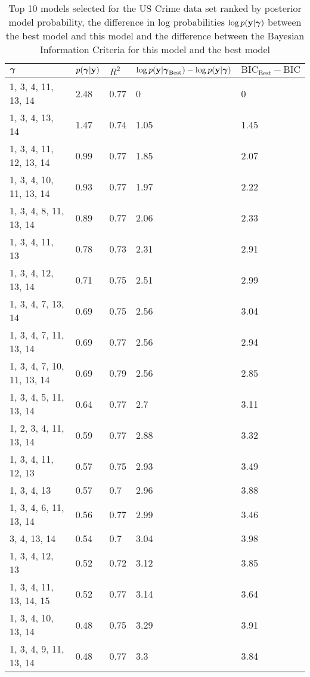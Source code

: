 \documentclass{amsart}
\begin{document}
\begin{table}
\label{tab:numerical_results_uscrime}
\caption{Top 10 models selected for the US Crime data set ranked by posterior model probability, the
					difference in log probabilities $\log p({\bf y}|{\boldsymbol \gamma})$ between the best model and this model and the difference between the Bayesian Information Criteria for this model and the best model}
\begin{tabular}{|l|llll|}
\hline
${\boldsymbol \gamma}$ & $p({\boldsymbol \gamma}|{\bf y})$ & $R^2$ & $\log p({\bf y} | {\boldsymbol \gamma}_\text{Best}) - \log p({\bf y} | {\boldsymbol \gamma})$ & $\text{BIC}_\text{Best} - \text{BIC}$ \\
\hline
1, 3, 4, 11, 13, 14&  2.48&  0.77&  0&  0\\
1, 3, 4, 13, 14&  1.47&  0.74&  1.05&  1.45\\
1, 3, 4, 11, 12, 13, 14&  0.99&  0.77&  1.85&  2.07\\
1, 3, 4, 10, 11, 13, 14&  0.93&  0.77&  1.97&  2.22\\
1, 3, 4, 8, 11, 13, 14&  0.89&  0.77&  2.06&  2.33\\
1, 3, 4, 11, 13&  0.78&  0.73&  2.31&  2.91\\
1, 3, 4, 12, 13, 14&  0.71&  0.75&  2.51&  2.99\\
1, 3, 4, 7, 13, 14&  0.69&  0.75&  2.56&  3.04\\
1, 3, 4, 7, 11, 13, 14&  0.69&  0.77&  2.56&  2.94\\
1, 3, 4, 7, 10, 11, 13, 14&  0.69&  0.79&  2.56&  2.85\\
1, 3, 4, 5, 11, 13, 14&  0.64&  0.77&  2.7&  3.11\\
1, 2, 3, 4, 11, 13, 14&  0.59&  0.77&  2.88&  3.32\\
1, 3, 4, 11, 12, 13&  0.57&  0.75&  2.93&  3.49\\
1, 3, 4, 13&  0.57&  0.7&  2.96&  3.88\\
1, 3, 4, 6, 11, 13, 14&  0.56&  0.77&  2.99&  3.46\\
3, 4, 13, 14&  0.54&  0.7&  3.04&  3.98\\
1, 3, 4, 12, 13&  0.52&  0.72&  3.12&  3.85\\
1, 3, 4, 11, 13, 14, 15&  0.52&  0.77&  3.14&  3.64\\
1, 3, 4, 10, 13, 14&  0.48&  0.75&  3.29&  3.91\\
1, 3, 4, 9, 11, 13, 14&  0.48&  0.77&  3.3&  3.84\\
\hline
\end{tabular}
\end{table}
\end{document}
